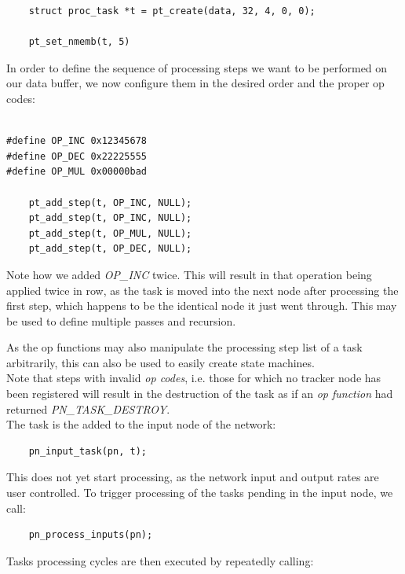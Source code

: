 \begin{lstlisting}
	struct proc_task *t = pt_create(data, 32, 4, 0, 0);

	pt_set_nmemb(t, 5)
\end{lstlisting}


\noindent In order to define the sequence of processing steps we want to be
performed on our data buffer, we now configure them in the desired order and
the proper op codes:

\begin{lstlisting}

#define OP_INC 0x12345678
#define OP_DEC 0x22225555 
#define OP_MUL 0x00000bad

	pt_add_step(t, OP_INC, NULL);
	pt_add_step(t, OP_INC, NULL);
	pt_add_step(t, OP_MUL, NULL);
	pt_add_step(t, OP_DEC, NULL);

\end{lstlisting}

\noindent
Note how we added \emph{OP\_INC} twice. This will result in that operation
being applied twice in row, as the task is moved into the next node after
processing the first step, which happens to be the identical node
it just went through. This may be used to define multiple passes and recursion.

As the op functions may also manipulate the processing step list of a task
arbitrarily, this can also be used to easily create state machines.
\\

\noindent
Note that steps with invalid \emph{op codes}, i.e. those for which no tracker
node has been registered will result in the destruction of the task as if
an \emph{op function} had returned \emph{PN\_TASK\_DESTROY}.
\\

\noindent
The task is the added to the input node of the network:

\begin{lstlisting}
	pn_input_task(pn, t);
\end{lstlisting}

\noindent
This does not yet start processing, as the network input and output rates are
user controlled. To trigger processing of the tasks pending in the input node,
we call:

\begin{lstlisting}
	pn_process_inputs(pn);
\end{lstlisting}


\noindent
Tasks processing cycles are then executed by repeatedly calling:

